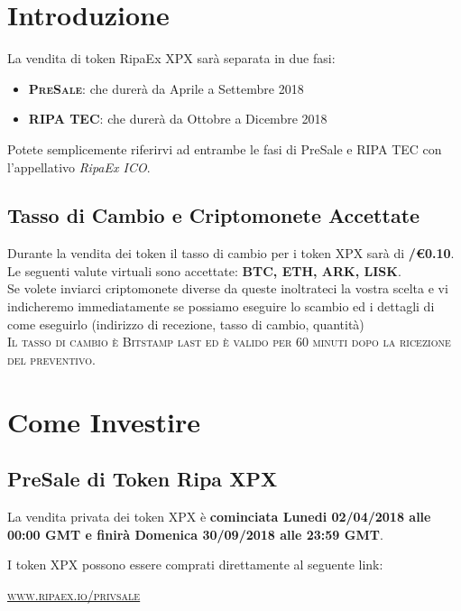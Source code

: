 \documentclass[11pt,fleqn,oneside]{book} %
\begin{document}
\section{Introduzione}
La vendita di token RipaEx XPX sarà separata in due fasi:
	\begin{itemize}
		\item \textbf{\textsc{PreSale}}: che durerà da Aprile a Settembre 2018
		\item \textbf{\textsc{RIPA TEC}}: che durerà da Ottobre a Dicembre 2018
	\end{itemize}
\vspace{5mm}
Potete semplicemente riferirvi ad entrambe le fasi di PreSale e RIPA TEC con l'appellativo \textit{RipaEx ICO}.

\subsection{Tasso di Cambio e Criptomonete Accettate}
Durante la vendita dei token il tasso di cambio per i token XPX sarà di \textbf{\PHP/\euro0.10}.\\

Le seguenti valute virtuali sono accettate: \textbf{BTC, ETH, ARK, LISK}.\\

Se volete inviarci criptomonete diverse da queste inoltrateci la vostra scelta e vi indicheremo immediatamente
se possiamo eseguire lo scambio ed i dettagli di come eseguirlo (indirizzo di recezione, tasso di cambio,
quantità)\\

\textsc{Il tasso di cambio è Bitstamp last ed è valido per 60 minuti dopo la ricezione del preventivo}.

\section{Come Investire}
\subsection{PreSale di Token Ripa XPX}
La vendita privata dei token XPX è \textbf{cominciata Lunedi 02/04/2018 alle 00:00 GMT e finirà Domenica
30/09/2018 alle 23:59 GMT}.

I token XPX possono essere comprati direttamente al seguente link:
\begin{center}
	\href{https://www.ripaex.io/privsale}{\textsc{www.ripaex.io/privsale}}
\end{center}
\end{document}
